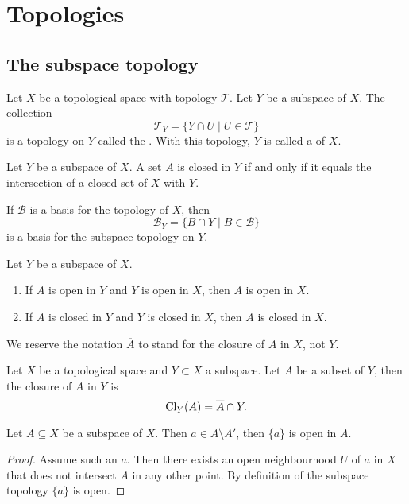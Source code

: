 \section{Topologies}

\subsection{The subspace topology}
\begin{definition}
Let $X$ be a topological space with topology $\mathcal{T}$. Let $Y$ be a subspace of $X$. The collection
\[ \mathcal{T}_Y = \{ Y\cap U\;|\; U\in \mathcal{T} \} \]
is a topology on $Y$ called the . With this topology, $Y$ is called a  of $X$.
\end{definition}
\begin{lemma}
Let $Y$ be a subspace of $X$. A set $A$ is closed in $Y$ \textup{if and only if} it equals the intersection of a closed set of $X$ with $Y$.
\end{lemma}

\begin{lemma}
If $\mathcal{B}$ is a basis for the topology of $X$, then
\[\mathcal{B}_Y = \{ B\cap Y \;|\; B\in \mathcal{B} \}\]
is a basis for the subspace topology on $Y$.
\end{lemma}

\begin{lemma}
Let $Y$ be a subspace of $X$.
\begin{enumerate}
\item If $A$ is open in $Y$ and $Y$ is open in $X$, then $A$ is open in $X$.
\item If $A$ is closed in $Y$ and $Y$ is closed in $X$, then $A$ is closed in $X$.
\end{enumerate}
\end{lemma}
 
We reserve the notation $\overline{A}$ to stand for the closure of $A$ in $X$, not $Y$.
\begin{lemma} \label{subspaceClosure}
Let $X$ be a topological space and $Y\subset X$ a subspace. Let $A$ be a subset of $Y$, then the closure of $A$ in $Y$ is
\[ \operatorname{Cl}_Y(A) = \overline{A}\cap Y.  \]
\end{lemma}

\begin{lemma} \label{notLimitPointSingletonOpen}
Let $A\subseteq X$ be a subspace of $X$. Then $a\in A\setminus A'$, then $\{a\}$ is open in $A$.
\end{lemma}
\begin{proof}
Assume such an $a$. Then there exists an open neighbourhood $U$ of $a$ in $X$ that does not intersect $A$ in any other point. By definition of the subspace topology $\{a\}$ is open.
\end{proof}

